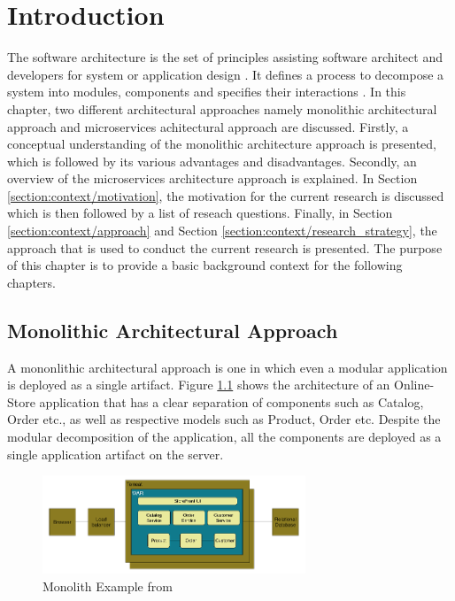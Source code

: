 \chapter{Introduction}\label{chapter:introduction}
The software architecture is the set of principles assisting software architect and developers for system or application design \cite{Dashofy:2009aa}. It defines a process to decompose a system into modules, components and specifies their interactions \cite{Brown:2015aa}. In this chapter, two different architectural approaches namely monolithic architectural approach and microservices achitectural approach are discussed. Firstly, a conceptual understanding of the monolithic architecture approach is presented, which is followed by its various advantages and disadvantages. Secondly, an overview of the microservices architecture approach is explained. In Section \ref{section:context/motivation}, the motivation for the current research is discussed which is then followed by a list of reseach questions. Finally, in Section \ref{section:context/approach} and Section \ref{section:context/research_strategy}, the approach that is used to conduct the current research is presented. The purpose of this chapter is to provide a basic background context for the following chapters.

\section{Monolithic Architectural Approach}\label{section:context/monolith}
A mononlithic architectural approach is one in which even a modular application is deployed as a single artifact. Figure \ref{fig:context/monolith-example} shows the architecture of an Online-Store application that has a clear separation of components such as Catalog, Order etc., as well as respective models such as Product, Order etc. Despite the modular decomposition of the application, all the components are deployed as a single application artifact on the server.\cite{Richardson:2014aa}\cite{Richardson:2014ab}

\begin{figure}[H]
\begin{center}
\includegraphics[width=0.7\textwidth]{figures/context-monolith-example}
\caption{Monolith Example from \cite{Richardson:2014aa}}
\label{fig:context/monolith-example}
\end{center}
\end{figure}

